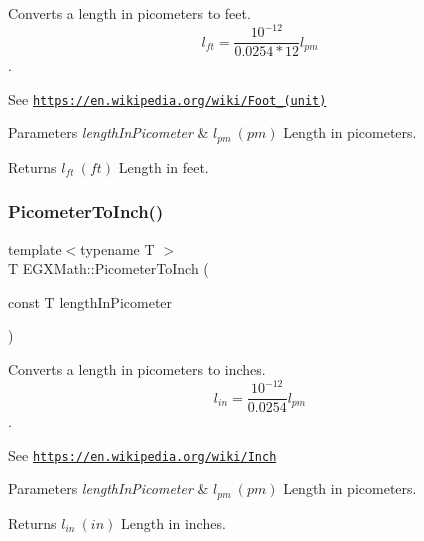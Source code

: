 Converts a length in picometers to feet. \[ l_{ft}= \frac{10^{-12}}{0.0254 * 12} l_{pm} \]. 

See \href{https://en.wikipedia.org/wiki/Foot_(unit)}{\tt https\+://en.\+wikipedia.\+org/wiki/\+Foot\+\_\+(unit)} 
\begin{DoxyParams}{Parameters}
{\em length\+In\+Picometer} & $ l_{pm}\ (pm)$ Length in picometers. \\
\hline
\end{DoxyParams}
\begin{DoxyReturn}{Returns}
$ l_{ft}\ (ft)$ Length in feet. 
\end{DoxyReturn}
\mbox{\label{group___e_g_x_math-_conversions-_length_conversions-_picometer-_imperial_ga163afd72563986ed456466be07efd3cb}} 
\subsubsection{\texorpdfstring{Picometer\+To\+Inch()}{PicometerToInch()}}
{\footnotesize\ttfamily template$<$typename T $>$ \\
T E\+G\+X\+Math\+::\+Picometer\+To\+Inch (\begin{DoxyParamCaption}\item[{const T}]{length\+In\+Picometer }\end{DoxyParamCaption})}



Converts a length in picometers to inches. \[ l_{in}= \frac{10^{-12}}{0.0254} l_{pm} \]. 

See \href{https://en.wikipedia.org/wiki/Inch}{\tt https\+://en.\+wikipedia.\+org/wiki/\+Inch} 
\begin{DoxyParams}{Parameters}
{\em length\+In\+Picometer} & $ l_{pm}\ (pm)$ Length in picometers. \\
\hline
\end{DoxyParams}
\begin{DoxyReturn}{Returns}
$ l_{in}\ (in)$ Length in inches. 
\end{DoxyReturn}
\mbox{\label{group___e_g_x_math-_conversions-_length_conversions-_picometer-_imperial_ga727778c82b4049ff45091f492993150d}} 
